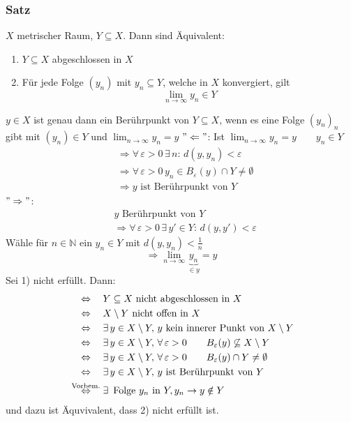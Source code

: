\subsubsection{Satz} %
\label{sub:Satz}
$X$ metrischer Raum, $Y \subseteq X$. Dann sind Äquivalent:
\begin{enumerate}
	\item $Y \subseteq X$ abgeschlossen in $X$
	\item Für jede Folge $(y_n)$ mit $y_n \subseteq Y$, welche in $X$ konvergiert, gilt
	\[
		\lim_{n \to \infty}y_n \in Y
	\]
	\end{enumerate}
 $y \in X$ ist genau dann ein Berührpunkt von $Y \subseteq X$, wenn es eine Folge $(y_n)_n$ gibt mit $(y_n) \in Y$ und $\lim_{n \to \infty}y_n = y$
$"\Leftarrow"$: Ist $\lim_{n \to \infty}y_n=y \qquad y_n \in Y$
\begin{align*}
	& \Rightarrow \forall\, \varepsilon>0 \,\exists\,n: \, d(y,y_n)<\varepsilon \\
	&\Rightarrow \forall\, \varepsilon>0 \, y_n \in B_{\varepsilon}(y) \cap Y \neq \emptyset \\
	&\Rightarrow y \text{ ist Berührpunkt von } Y
\end{align*}
$"\Rightarrow"$:
\begin{align*}
	&y \text{ Berührpunkt von } Y \\
	&\Rightarrow  \forall\, \varepsilon > 0 \, \exists\, y' \in Y: \, d(y,y')<\varepsilon
\end{align*}
Wähle für $n \in \mathbb{N}$ ein $y_n \in Y$ mit $d(y,y_n)<\frac{1}{n}$
\[
	\Rightarrow \lim_{n \to \infty}\underset{\in y}{\underbrace{y_n}}=y
\] \bewende
{}
Sei 1) nicht erfüllt. Dann:
\begin{align*}
	& \stackrel{\hphantom{\text{Vorbem.}}}{\Leftrightarrow}  Y \subseteq X \text{ nicht abgeschlossen in } X \\
	& \stackrel{\hphantom{\text{Vorbem.}}}{\Leftrightarrow} X \setminus Y \text{ nicht offen in } X \\
	& \stackrel{\hphantom{\text{Vorbem.}}}{\Leftrightarrow} \exists\,y \in X \setminus Y, \, y \text{ kein innerer Punkt von } X \setminus Y \\
	& \stackrel{\hphantom{\text{Vorbem.}}}{\Leftrightarrow} \exists\,y \in X \setminus Y, \, \forall\, \varepsilon>0 \qquad B_{\varepsilon}(y) \not\subseteq X
	 \setminus Y
	 \\
	& \stackrel{\hphantom{\text{Vorbem.}}}{\Leftrightarrow} \exists\,y \in X \setminus Y, \, \forall\, \varepsilon>0 \qquad B_{\varepsilon}(y) \cap Y \neq \emptyset
	 \\
	& \stackrel{\hphantom{\text{Vorbem.}}}{\Leftrightarrow} \exists\,y \in X \setminus Y, \, y \text{ ist Berührpunkt von } Y \\
	& \stackrel{\text{Vorbem.}}{\Leftrightarrow} \exists\, \text{ Folge } y_n \text{ in } Y, y_n \to y \notin  Y
\end{align*}
und dazu ist Äquvivalent, dass 2) nicht erfüllt ist.
\bewende
